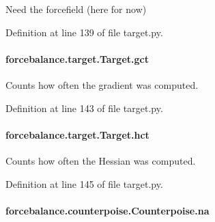 Need the forcefield (here for now) 



Definition at line 139 of file target.\-py.

\hypertarget{classforcebalance_1_1target_1_1Target_aa625ac88c6744eb14ef281d9496d0dbb}{
\paragraph[{gct}]{\setlength{\rightskip}{0pt plus 5cm}forcebalance.\-target.\-Target.\-gct\hspace{0.3cm}{\ttfamily [inherited]}}}\label{classforcebalance_1_1target_1_1Target_aa625ac88c6744eb14ef281d9496d0dbb}


Counts how often the gradient was computed. 



Definition at line 143 of file target.\-py.

\hypertarget{classforcebalance_1_1target_1_1Target_a5b5a42f78052b47f29ed4b940c6111a1}{
\paragraph[{hct}]{\setlength{\rightskip}{0pt plus 5cm}forcebalance.\-target.\-Target.\-hct\hspace{0.3cm}{\ttfamily [inherited]}}}\label{classforcebalance_1_1target_1_1Target_a5b5a42f78052b47f29ed4b940c6111a1}


Counts how often the Hessian was computed. 



Definition at line 145 of file target.\-py.

\hypertarget{classforcebalance_1_1counterpoise_1_1Counterpoise_a4b7699f3f3b2bd34aaa3fe8374c2ff69}{
\paragraph[{na}]{\setlength{\rightskip}{0pt plus 5cm}forcebalance.\-counterpoise.\-Counterpoise.\-na}}\label{classforcebalance_1_1counterpoise_1_1Counterpoise_a4b7699f3f3b2bd34aaa3fe8374c2ff69}


